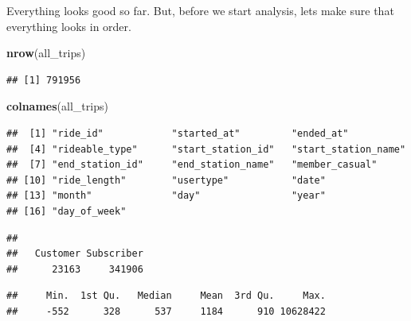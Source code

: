 \documentclass[
]{article}
\newenvironment{Shaded}{\begin{snugshade}}{\end{snugshade}}
\newcommand{\FunctionTok}[1]{\textcolor[rgb]{0.13,0.29,0.53}{\textbf{#1}}}
\newcommand{\NormalTok}[1]{#1}
\newcommand{\SpecialCharTok}[1]{\textcolor[rgb]{0.81,0.36,0.00}{\textbf{#1}}}
\begin{document}
Everything looks good so far. But, before we start analysis, lets make
sure that everything looks in order.

\begin{Shaded}
\begin{Highlighting}[]
\FunctionTok{nrow}\NormalTok{(all\_trips)}
\end{Highlighting}
\end{Shaded}

\begin{verbatim}
## [1] 791956
\end{verbatim}

\begin{Shaded}
\begin{Highlighting}[]
\FunctionTok{colnames}\NormalTok{(all\_trips)}
\end{Highlighting}
\end{Shaded}

\begin{verbatim}
##  [1] "ride_id"            "started_at"         "ended_at"          
##  [4] "rideable_type"      "start_station_id"   "start_station_name"
##  [7] "end_station_id"     "end_station_name"   "member_casual"     
## [10] "ride_length"        "usertype"           "date"              
## [13] "month"              "day"                "year"              
## [16] "day_of_week"
\end{verbatim}

\begin{Shaded}
\end{Shaded}

\begin{verbatim}
## 
##   Customer Subscriber 
##      23163     341906
\end{verbatim}

\begin{Shaded}
\end{Shaded}

\begin{verbatim}
##     Min.  1st Qu.   Median     Mean  3rd Qu.     Max. 
##     -552      328      537     1184      910 10628422
\end{verbatim}
\end{document}
